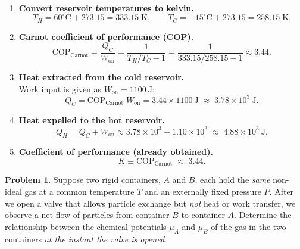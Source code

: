 \documentclass[12pt]{article}
\theoremstyle{definition} %
\newtheorem{problem}{Problem}
\theoremstyle{plain} %
\begin{document}
\begin{enumerate}
  \item \textbf{Convert reservoir temperatures to kelvin.}
        \[
          T_H = 60^{\circ}\mathrm{C} + 273.15 = 333.15\;\mathrm{K},
          \qquad
          T_C = -15^{\circ}\mathrm{C} + 273.15 = 258.15\;\mathrm{K}.
        \]

  \item \textbf{Carnot coefficient of performance (COP).}
        \[
          \text{COP}_{\text{Carnot}}
          = \frac{Q_C}{W_{\text{on}}}
          = \frac{1}{T_H/T_C - 1}
          = \frac{1}{333.15/258.15 - 1}
          \approx 3.44.
        \]

  \item \textbf{Heat extracted from the cold reservoir.}\\
        Work input is given as \(W_{\text{on}} = 1100\ \text{J}\):
        \[
          Q_C
          = \text{COP}_{\text{Carnot}}\; W_{\text{on}}
          = 3.44 \times 1100\ \text{J}
          \;\approx\;
          \boxed{3.78 \times 10^{3}\ \text{J}}.
        \]

  \item \textbf{Heat expelled to the hot reservoir.}
        \[
          Q_H
          = Q_C + W_{\text{on}}
          \approx 3.78 \times 10^{3} + 1.10 \times 10^{3}
          \;\approx\;
          \boxed{4.88 \times 10^{3}\ \text{J}}.
        \]

  \item \textbf{Coefficient of performance (already obtained).}
        \[
          K \equiv \text{COP}_{\text{Carnot}}
          \;\approx\;
          \boxed{3.44}.
        \]
\end{enumerate}
\begin{problem}
  Suppose two rigid containers, $A$ and $B$, each hold the \emph{same} non-ideal gas at a common temperature $T$ and an externally fixed pressure $P$.
  After we open a valve that allows particle exchange but \emph{not} heat or work transfer, we observe a net flow of particles from container $B$ to container $A$.
  Determine the relationship between the chemical potentials $\mu_A$ and $\mu_B$ of the gas in the two containers \emph{at the instant the valve is opened}.  
  \end{problem}
  
\end{document}
